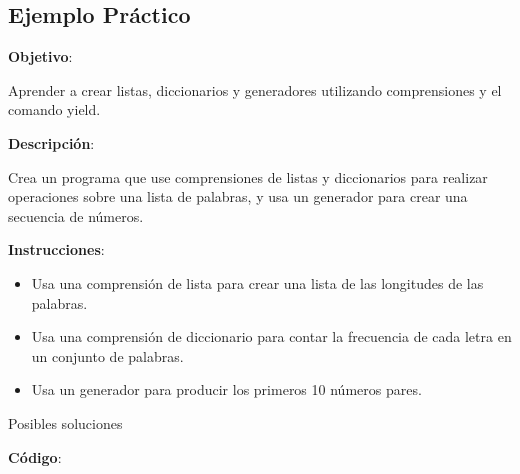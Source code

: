 \documentclass[
  a4paper,
  DIV=11,
  numbers=noendperiod,
  onepage,
  openany]{scrreprt}
\begin{document}
\subsection{Ejemplo Práctico}\label{ejemplo-pruxe1ctico-4}

\textbf{Objetivo}:

Aprender a crear listas, diccionarios y generadores utilizando
comprensiones y el comando yield.

\textbf{Descripción}:

Crea un programa que use comprensiones de listas y diccionarios para
realizar operaciones sobre una lista de palabras, y usa un generador
para crear una secuencia de números.

\textbf{Instrucciones}:

\begin{itemize}
\item
  Usa una comprensión de lista para crear una lista de las longitudes de
  las palabras.
\item
  Usa una comprensión de diccionario para contar la frecuencia de cada
  letra en un conjunto de palabras.
\item
  Usa un generador para producir los primeros 10 números pares.
\end{itemize}

Posibles soluciones

\textbf{Código}:
\end{document}
